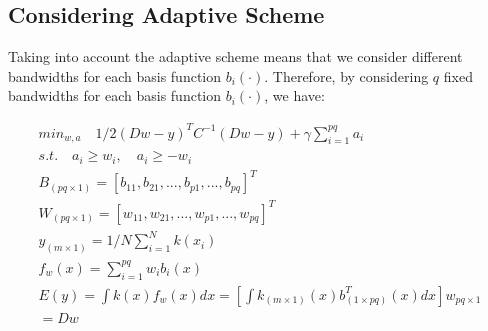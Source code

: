 \subsection{Considering Adaptive Scheme}
Taking into account the adaptive scheme means that we consider different bandwidths for each basis function $b_i(\cdot)$. Therefore, by considering $q$ fixed bandwidths for each basis function $b_i(\cdot)$, we have:\par%
\begin{align}
     min_{w,a} \quad 1/2(Dw - y)^TC^{-1}(Dw - y) +\gamma \sum_{i = 1}^{pq} a_i \\%
     s. t. \quad a_i \geq w_i, \quad a_i \geq -w_i\\
    B_{(pq \times 1)} =[b_{11}, b_{21} ,..., b_{p1}, ..., b_{pq}]^T\\%
    W_{(pq \times 1)} =[w_{11}, w_{21} ,..., w_{p1}, ..., w_{pq}]^T\\%
    y_{(m \times 1)} = 1/N \sum_{i = 1}^N k(x_i)\\
    f_w(x) = \sum_{i=1}^{pq} w_{i}b_{i}(x) \\%
    E(y) = \int k(x)f_w(x) dx= \left[\int k_{(m \times 1)}(x)b^T_{(1 \times pq)}(x)dx \right]w_{pq \times 1} \\
    =Dw\\
\end{align}

